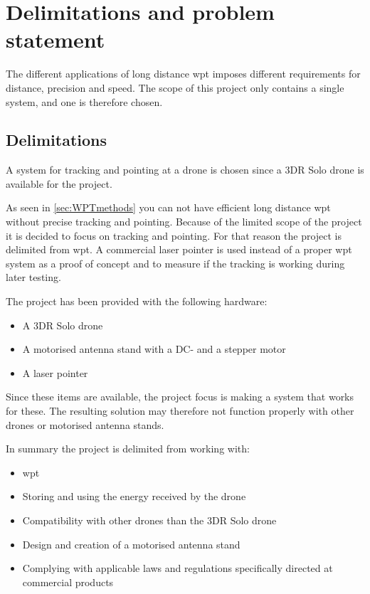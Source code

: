 \chapter{Delimitations and problem statement}\label{ch:ProblemStatement}
The different applications of long distance \gls{wpt} imposes different requirements for distance, precision and speed. The scope of this project only contains a single system, and one is therefore chosen.

\section{Delimitations}


A system for tracking and pointing at a drone is chosen since a 3DR Solo drone is available for the project.

As seen in \autoref{sec:WPTmethods} you can not have efficient long distance \gls{wpt} without precise tracking and pointing. Because of the limited scope of the project it is decided to focus on tracking and pointing. For that reason the project is delimited from \gls{wpt}. A commercial laser pointer is used instead of a proper \gls{wpt} system as a proof of concept and to measure if the tracking is working during later testing.

The project has been provided with the following hardware:
\begin{itemize}
\item A 3DR Solo drone
\item A motorised antenna stand with a DC- and a stepper motor
\item A laser pointer
\end{itemize}

Since these items are available, the project focus is making a system that works for these. The resulting solution may therefore not function properly with other drones or motorised antenna stands. 

\newpage
In summary the project is delimited from working with:
\begin{itemize}
\item \gls{wpt}
\item Storing and using the energy received by the drone
\item Compatibility with other drones than the 3DR Solo drone
\item Design and creation of a motorised antenna stand
\item Complying with applicable laws and regulations specifically directed at commercial products
\end{itemize}

